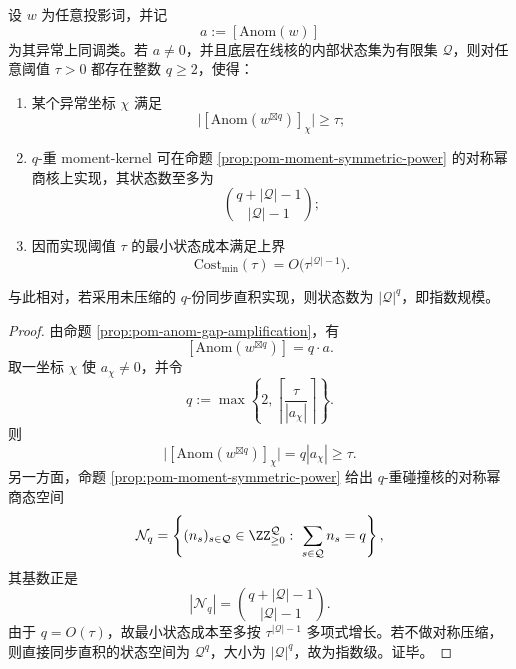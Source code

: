 \begin{theorem}[异常显影阈值的多项式编译成本]\label{thm:xi-time-part79-anom-threshold-polynomial-compilation-cost}
设 \(w\) 为任意投影词，并记
\[
a:=[\mathrm{Anom}(w)]
\]
为其异常上同调类。若 \(a\neq 0\)，并且底层在线核的内部状态集为有限集 \(\mathcal Q\)，则对任意阈值 \(\tau>0\) 都存在整数 \(q\ge 2\)，使得：
\begin{enumerate}
  \item 某个异常坐标 \(\chi\) 满足
  \[
  \bigl|[\mathrm{Anom}(w^{\boxtimes q})]_{\chi}\bigr|\ge \tau;
  \]
  \item \(q\)-重 moment-kernel 可在命题 \ref{prop:pom-moment-symmetric-power} 的对称幂商核上实现，其状态数至多为
  \[
  \binom{q+|\mathcal Q|-1}{|\mathcal Q|-1};
  \]
  \item 因而实现阈值 \(\tau\) 的最小状态成本满足上界
  \[
  \mathrm{Cost}_{\min}(\tau)=O\!\bigl(\tau^{|\mathcal Q|-1}\bigr).
  \]
\end{enumerate}
与此相对，若采用未压缩的 \(q\)-份同步直积实现，则状态数为 \(|\mathcal Q|^q\)，即指数规模。
\end{theorem}
\begin{proof}
由命题 \ref{prop:pom-anom-gap-amplification}，有
\[
[\mathrm{Anom}(w^{\boxtimes q})]=q\cdot a.
\]
取一坐标 \(\chi\) 使 \(a_\chi\neq 0\)，并令
\[
q:=\max\!\left\{2,\left\lceil \frac{\tau}{|a_\chi|}\right\rceil\right\}.
\]
则
\[
\bigl|[\mathrm{Anom}(w^{\boxtimes q})]_{\chi}\bigr|
=
q|a_\chi|
\ge \tau.
\]
另一方面，命题 \ref{prop:pom-moment-symmetric-power} 给出 \(q\)-重碰撞核的对称幂商态空间
\[
\mathcal N_q=\left\{(n_s)_{s\in\mathcal Q}\in\ZZ_{\ge 0}^{\mathcal Q}:\ \sum_{s\in\mathcal Q}n_s=q\right\},
\]
其基数正是
\[
|\mathcal N_q|=\binom{q+|\mathcal Q|-1}{|\mathcal Q|-1}.
\]
由于 \(q=O(\tau)\)，故最小状态成本至多按 \(\tau^{|\mathcal Q|-1}\) 多项式增长。若不做对称压缩，则直接同步直积的状态空间为 \(\mathcal Q^q\)，大小为 \(|\mathcal Q|^q\)，故为指数级。证毕。
\end{proof}

